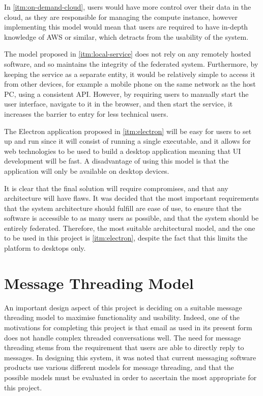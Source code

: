 In \ref{itm:on-demand-cloud}, users would have more control over their data in the cloud, as they are responsible for managing the compute instance, however implementing this model would mean that users are required to have in-depth knowledge of AWS or similar, which detracts from the usability of the system.

The model proposed in \ref{itm:local-service} does not rely on any remotely hosted software, and so maintains the integrity of the federated system. Furthermore, by keeping the service as a separate entity, it would be relatively simple to access it from other devices, for example a mobile phone on the same network as the host PC, using a consistent API. However, by requiring users to manually start the user interface, navigate to it in the browser, and then start the service, it increases the barrier to entry for less technical users.

The Electron application proposed in \ref{itm:electron} will be easy for users to set up and run since it will consist of running a single executable, and it allows for web technologies to be used to build a desktop application meaning that UI development will be fast. A disadvantage of using this model is that the application will only be available on desktop devices.

It is clear that the final solution will require compromises, and that any architecture will have flaws. It was decided that the most important requirements that the system architecture should fulfill are ease of use, to ensure that the software is accessible to as many users as possible, and that the system should be entirely federated. Therefore, the most suitable architectural model, and the one to be used in this project is \ref{itm:electron}, despite the fact that this limits the platform to desktops only.

\section{Message Threading Model}\label{sec:message-threading-model}
An important design aspect of this project is deciding on a suitable message threading model to maximise functionality and usability. Indeed, one of the motivations for completing this project is that email as used in its present form does not handle complex threaded conversations well. The need for message threading stems from the requirement that users are able to directly reply to messages. In designing this system, it was noted that current messaging software products use various different models for message threading, and that the possible models must be evaluated in order to ascertain the most appropriate for this project.

